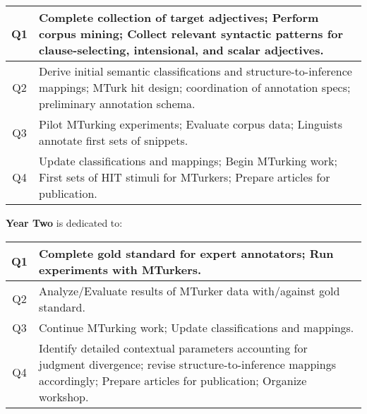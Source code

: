 \documentclass[10pt]{article}
\newcommand{\miniskip}{\vspace*{1mm}}
\begin{document}
\vspace{1mm}\noindent
{\small
\begin{tabularx}{470pt}{|c|X|}

\hline

Q1 & Complete collection of target adjectives; Perform corpus mining;  Collect relevant syntactic patterns for clause-selecting, intensional, and scalar adjectives. 
\\
\hline

Q2 & Derive initial semantic classifications and structure-to-inference mappings; MTurk hit design; coordination of annotation specs; preliminary annotation schema.
 \\

\hline

Q3 & Pilot MTurking experiments;  Evaluate corpus data; Linguists annotate first sets of snippets.    \\
 
\hline

Q4 & Update classifications and mappings; Begin MTurking work; First sets of HIT stimuli for MTurkers; Prepare articles for publication.     \\

\hline

\end{tabularx}
}

\miniskip\noindent
{\bf Year Two} is dedicated to: 

\vspace{2mm}\noindent
{\small
\begin{tabularx}{470pt}{|c|X|}

\hline

Q1 	&  Complete gold standard for expert annotators; Run experiments with MTurkers. \\

\hline

Q2	& Analyze/Evaluate results of MTurker data with/against gold standard. \\

\hline

Q3	&  Continue MTurking work; Update classifications and mappings. \\

\hline

Q4	& Identify detailed contextual parameters accounting for judgment divergence; revise structure-to-inference mappings accordingly; Prepare articles for
       publication;  Organize workshop. \\
\hline

\end{tabularx}
}
\end{document}
